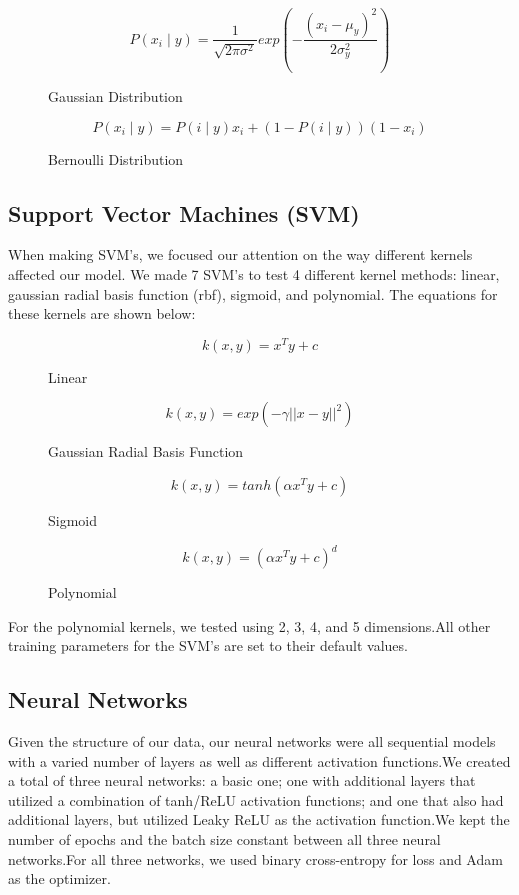 \begin{figure}[h!]
    \[ P(x_i \mid y) = \frac{1}{\sqrt{2\pi\sigma^2}}exp(-\frac{(x_i - \mu_y)^2}{2\sigma_y^2}) \]
    \caption{Gaussian Distribution}
    \vspace{1pt}
    \[ P(x_i \mid y) = P(i \mid y)x_i + (1-P(i \mid y))(1-x_i) \]
    \caption{Bernoulli Distribution}
\end{figure}

\subsection{Support Vector Machines (SVM)}

When making SVM’s, we focused our attention on the way different kernels affected our model. We made 7 SVM’s to test 4 different kernel methods: linear, gaussian radial basis function (rbf), sigmoid, and polynomial. The equations for these kernels are shown below:

\vspace{-10pt}

\begin{figure}[h!]
    \[ k(x,y) = x^T y + c \]
    \caption{Linear}
    \vspace{1pt}
    \[ k(x,y) = exp(-\gamma ||x-y||^2) \]
    \caption{Gaussian Radial Basis Function}
    \vspace{1pt}
    \[ k(x,y) = tanh(\alpha x^T y + c) \]
    \caption{Sigmoid}
    \vspace{1pt}
    \[ k(x,y) = (\alpha x^T y + c)^d \]
    \caption{Polynomial}
\end{figure}

For the polynomial kernels, we tested using 2, 3, 4, and 5 dimensions.\hspace{1pt}All other training parameters for the SVM’s are set to their default values.

\subsection{Neural Networks}

Given the structure of our data, our neural networks were all sequential models with a varied number of layers as well as different activation functions.\hspace{1pt}We created a total of three neural networks: a basic one; one with additional layers that utilized a combination of tanh/ReLU activation functions; and one that also had additional layers, but utilized Leaky ReLU as the activation function.\hspace{1pt}We kept the number of epochs and the batch size constant between all three neural networks.\hspace{1pt}For all three networks, we used binary cross-entropy for loss and Adam as the optimizer.\\

